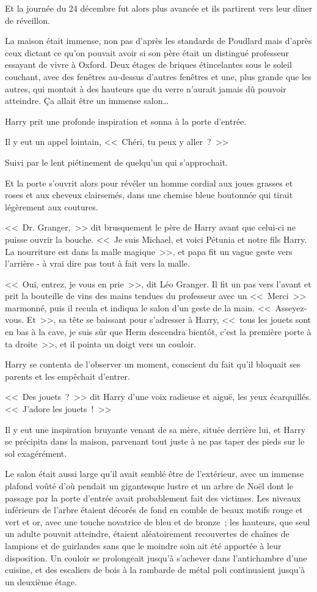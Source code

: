 Et la journée du 24 décembre fut alors plus avancée et ils partirent vers leur dîner de réveillon.

\later

La maison était immense, non pas d'après les standards de Poudlard mais d'après ceux dictant ce qu'on pouvait avoir si son père était un distingué professeur essayant de vivre à Oxford. Deux étages de briques étincelantes sous le soleil couchant, avec des fenêtres au-dessus d'autres fenêtres et une, plus grande que les autres, qui montait à des hauteurs que du verre n'aurait jamais dû pouvoir atteindre. Ça allait être un immense salon…

Harry prit une profonde inspiration et sonna à la porte d'entrée.

Il y eut un appel lointain, <<~Chéri, tu peux y aller~?~>>

Suivi par le lent piétinement de quelqu'un qui s'approchait.

Et la porte s'ouvrit alors pour révéler un homme cordial aux joues grasses et roses et aux cheveux clairsemés, dans une chemise bleue boutonnée qui tirait légèrement aux coutures.

<<~Dr. Granger,~>> dit brusquement le père de Harry avant que celui-ci ne puisse ouvrir la bouche. <<~Je suis Michael, et voici Pétunia et notre fils Harry. La nourriture est dans la malle magique~>>, et papa fit un vague geste vers l'arrière - à vrai dire pas tout à fait vers la malle.

<<~Oui, entrez, je vous en prie~>>, dit Léo Granger. Il fit un pas vers l'avant et prit la bouteille de vins des mains tendues du professeur avec un <<~Merci~>> marmonné, puis il recula et indiqua le salon d'un geste de la main. <<~Asseyez-vous. Et~>>, sa tête se baissant pour s'adresser à Harry, <<~tous les jouets sont en bas à la cave, je suis sûr que Herm descendra bientôt, c'est la première porte à ta droite~>>, et il pointa un doigt vers un couloir.

Harry se contenta de l'observer un moment, conscient du fait qu'il bloquait ses parents et les empêchait d'entrer.

<<~Des jouets~?~>> dit Harry d'une voix radieuse et aiguë, les yeux écarquillés. <<~J'adore les jouets~!~>>

Il y eut une inspiration bruyante venant de sa mère, située derrière lui, et Harry se précipita dans la maison, parvenant tout juste à ne pas taper des pieds sur le sol exagérément.

Le salon était aussi large qu'il avait semblé être de l'extérieur, avec un immense plafond voûté d'où pendait un gigantesque lustre et un arbre de Noël dont le passage par la porte d'entrée avait probablement fait des victimes. Les niveaux inférieurs de l'arbre étaient décorés de fond en comble de beaux motifs rouge et vert et or, avec une touche novatrice de bleu et de bronze~; les hauteurs, que seul un adulte pouvait atteindre, étaient aléatoirement recouvertes de chaînes de lampions et de guirlandes sans que le moindre soin ait été apportée à leur disposition. Un couloir se prolongeait jusqu'à s'achever dans l'antichambre d'une cuisine, et des escaliers de bois à la rambarde de métal poli continuaient jusqu'à un deuxième étage.

